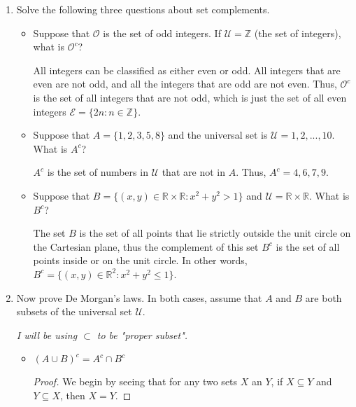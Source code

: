 \documentclass{article}
\begin{document}
\begin{enumerate}
    \item {
        Solve the following three questions about set complements.

        \begin{itemize}
            \item {
                Suppose that \(\mathcal{O}\) is the set of odd integers. If 
                \(\mathcal{U} = \mathbb{Z}\) (the set of integers), what is
                \(\mathcal{O}^c\)?

                All integers can be classified as either even or odd. All integers 
                that are even are not odd, and all the integers that are odd are not
                even. Thus, \(\mathcal{O}^c\) is the set of all integers that are 
                not odd, which is just the set of all even integers 
                \(\mathcal{E} = \{2n : n \in \mathbb{Z}\}\).
            }

            \item {
                Suppose that \(A = \{1, 2, 3, 5, 8\}\) and the universal set is 
                \(\mathcal{U} = {1,2,...,10}\). What is \(A^c\)?

                \(A^c\) is the set of numbers in \(\mathcal{U}\) that are not in 
                \(A\). Thus, \(A^c = {4, 6, 7, 9}\).
            }

            \item {
                Suppose that \(B = \{(x,y) \in \mathbb{R} \times \mathbb{R} : x^2 + y^2 > 1\}\)
                and \(\mathcal{U} = \mathbb{R} \times \mathbb{R}\). What is \(B^c\)?

                The set \(B\) is the set of all points that lie strictly outside 
                the unit circle on the Cartesian plane, thus the complement of 
                this set \(B^c \) is the set of all points inside or on the unit 
                circle. In other words, \(B^c = \{(x,y) \in \mathbb{R}^2 : x^2 + y^2 \le 1\}\).
            }
        \end{itemize}
    }

    \item {
        Now prove De Morgan's laws. In both cases, assume that \(A\) and \(B\) are 
        both subsets of the universal set \(\mathcal{U}\).

        \emph{I will be using \(\subset\) to be "proper subset".}

        \begin{itemize}
            \item {
                \((A \cup B)^c = A^c \cap B^c\)
                \begin{proof}
                    We begin by seeing that for any two sets \(X\) an \(Y\), if \(X \subseteq Y\) 
                    and \(Y \subseteq X\), then \(X = Y\).


\end{proof}}
\end{itemize}}
\end{enumerate}
\end{document}
